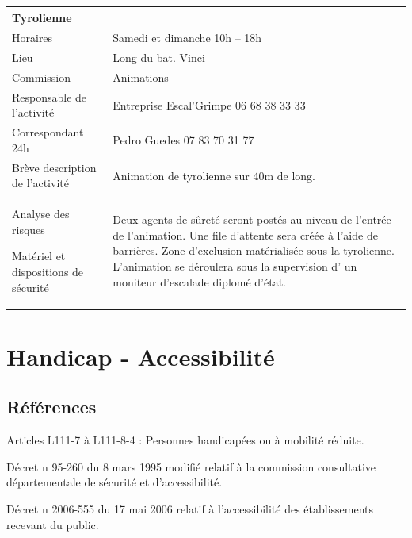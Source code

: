 \documentclass[hidelinks, paper=a4, fontsize=13pt]{report}
\begin{document}
\begin{center}
\begin{tabular}{ | p{6cm} | p{10cm} | }
\hline
	\multicolumn{2}{|l|}{Tyrolienne}  \\ \hline
	Horaires & Samedi et dimanche 10h – 18h \\ \hline
	Lieu & Long du bat. Vinci \\ \hline
	Commission & Animations \\ \hline
	Responsable de l'activité & Entreprise Escal'Grimpe 06 68 38 33 33\\ \hline
	Correspondant 24h & Pedro Guedes 07 83 70 31 77 \\ \hline
	Brève description de l'activité & Animation de tyrolienne sur 40m de long.  \\ \hline
	Analyse des risques

Matériel et dispositions de sécurité & Deux agents de sûreté seront postés au niveau de l’entrée de l’animation. Une file d’attente sera créée à l’aide de barrières. Zone d’exclusion matérialisée sous la tyrolienne. L'animation se déroulera sous la supervision d' un moniteur d’escalade diplomé d’état. \\ \hline
\end{tabular}
\end{center}



\chapter{ Handicap - Accessibilité}

\section{Références}

\begin{list}{•}{}
\item Articles L111-7 à L111-8-4 : Personnes handicapées ou à mobilité réduite.
\item Décret n  95-260 du 8 mars 1995 modifié relatif à la commission consultative départementale de sécurité et d'accessibilité.
\item Décret  n 2006-555 du 17 mai 2006 relatif à l'accessibilité des établissements recevant du public.
\end{list}
\end{document}
